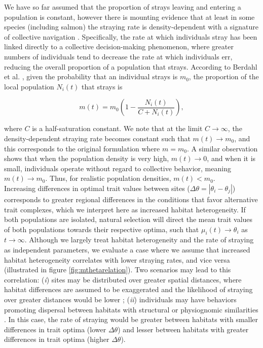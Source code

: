 \documentclass{revtex4}
\begin{document}
\noindent We have so far assumed that the proportion of strays leaving and entering a population is constant, however there is mounting evidence that at least in some species (including salmon) the straying rate is density-dependent with a signature of collective navigation \citep{Berdahl:2016dx,Bett:2017ha}.
Specifically, the rate at which individuals stray has been linked directly to a collective decision-making phenomenon, where greater numbers of individuals tend to decrease the rate at which individuals err, reducing the overall proportion of a population that strays.
According to Berdahl et al. \citep{Berdahl:2014bl,Berdahl:2016dx}, given the probability that an individual strays is $m_0$, the proportion of the local population $N_i(t)$ that strays is

\begin{equation}
  m(t) = m_0\left(1- \frac{N_i(t)}{C+N_i(t)}\right),
  \label{eq:ddm}
\end{equation}

\noindent where $C$ is a half-saturation constant.
We note that at the limit $C\rightarrow \infty$, the density-dependent straying rate becomes constant such that $m(t) \rightarrow m_0$, and this corresponds to the original formulation where $m=m_0$.
A similar observation shows that when the population density is very high, $m(t) \rightarrow 0$, and when it is small, individuals operate without regard to collective behavior, meaning $m(t) \rightarrow m_0$.
Thus, for realistic population densities, $m(t) < m_0$.\\


\noindent Increasing differences in optimal trait values between sites ($\Delta\theta = \left|\theta_i - \theta_j\right|$) corresponds to greater regional differences in the conditions that favor alternative trait complexes, which we interpret here as increased habitat heterogeneity.
If both populations are isolated, natural selection will direct the mean trait values of both populations towards their respective optima, such that $\mu_i(t) \rightarrow \theta_i$ as $t\rightarrow\infty$.
Although we largely treat habitat heterogeneity and the rate of straying as independent parameters, we evaluate a case where we assume that increased habitat heterogeneity correlates with lower straying rates, and vice versa (illustrated in figure \ref{fig:mthetarelation}).
Two scenarios may lead to this correlation: 
(\emph{i}) sites may be distributed over greater spatial distances, where habitat differences are assumed to be exaggerated and the likelihood of straying over greater distances would be lower \citep{Candy:2000hu,JPE:JPE1383};
(\emph{ii}) individuals may have behaviors promoting dispersal between habitats with structural or physiognomic similarities \citep{Peterson:2014gy}.
In this case, the rate of straying would be greater between habitats with smaller differences in trait optima (lower $\Delta\theta$) and lesser between habitats with greater differences in trait optima (higher $\Delta\theta$).
\end{document}
